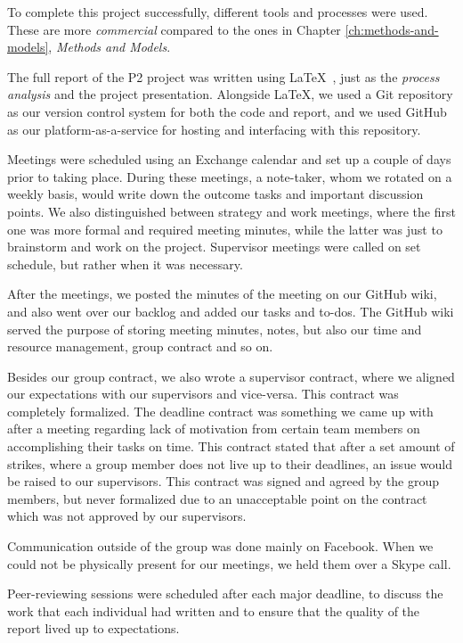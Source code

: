To complete this project successfully, different tools and processes were used. These are more \textit{commercial} compared to the ones in Chapter \ref{ch:methods-and-models}, \textit{Methods and Models}.

The full report of the P2 project was written using \LaTeX ~, just as the \textit{process analysis} and the project presentation. Alongside \LaTeX , we used a Git repository as our version control system for both the code and report, and we used GitHub as our platform-as-a-service for hosting and interfacing with this repository.

Meetings were scheduled using an Exchange calendar and set up a couple of days prior to taking place. During these meetings, a note-taker, whom we rotated on a weekly basis, would write down the outcome tasks and important discussion points. We also distinguished between strategy and work meetings, where the first one was more formal and required meeting minutes, while the latter was just to brainstorm and work on the project. Supervisor meetings were called on set schedule, but rather when it was necessary.

After the meetings, we posted the minutes of the meeting on our GitHub wiki, and also went over our backlog and added our tasks and to-dos. The GitHub wiki served the purpose of storing meeting minutes, notes, but also our time and resource management, group contract and so on. 

Besides our group contract, we also wrote a supervisor contract, where we aligned our expectations with our supervisors and vice-versa. This contract was completely formalized. The deadline contract was something we came up with after a meeting regarding lack of motivation from certain team members on accomplishing their tasks on time. This contract stated that after a set amount of strikes, where a group member does not live up to their deadlines, an issue would be raised to our supervisors. This contract was signed and agreed by the group members, but never formalized due to an unacceptable point on the contract which was not approved by our supervisors.

Communication outside of the group was done mainly on Facebook. When we could not be physically present for our meetings, we held them over a Skype call.

Peer-reviewing sessions were scheduled after each major deadline, to discuss the work that each individual had written and to ensure that the quality of the report lived up to expectations.

